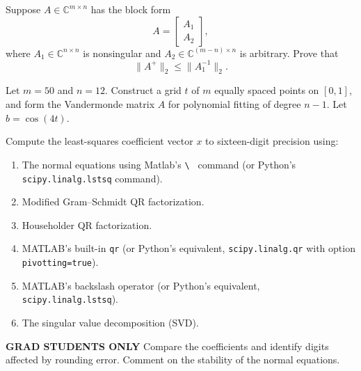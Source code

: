 \documentclass{ximera}
\begin{document}
\begin{exercise}
[11.1] Suppose \(A\in\mathbb{C}^{m\times n}\) has the block form
\[
A =
\begin{bmatrix}
A_1 \\
A_2
\end{bmatrix},
\]
where \(A_1\in\mathbb{C}^{n\times n}\) is nonsingular and
\(A_2\in\mathbb{C}^{(m-n)\times n}\) is arbitrary.
Prove that
\[
\|A^+\|_2 \leq \|A_1^{-1}\|_2.
\]
\end{exercise}

\begin{exercise}
[11.3] Let \(m=50\) and \(n=12\). Construct a grid \(t\) of
\(m\) equally spaced points on \([0,1]\), and form the
Vandermonde matrix \(A\) for polynomial fitting of degree
\(n-1\). Let \(b=\cos(4t)\).

Compute the least-squares coefficient vector \(x\) to
sixteen-digit precision using:
\begin{enumerate}
    \item The normal equations using Matlab's \verb|\ | command (or Python's \verb|scipy.linalg.lstsq| command).
    \item Modified Gram--Schmidt QR factorization.
    \item Householder QR factorization.
    \item MATLAB's built-in \texttt{qr} (or Python's equivalent, \verb|scipy.linalg.qr| with option \verb|pivotting=true|).
    \item MATLAB's backslash operator (or Python's equivalent, \verb|scipy.linalg.lstsq|).
    \item The singular value decomposition (SVD).
\end{enumerate}

\textbf{GRAD STUDENTS ONLY} Compare the coefficients and identify digits affected by
rounding error. Comment on the stability of the normal equations.
\end{exercise}
\end{document}
